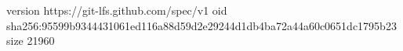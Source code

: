 version https://git-lfs.github.com/spec/v1
oid sha256:95599b9344431061ed116a88d59d2e29244d1db4ba72a44a60c0651dc1795b23
size 21960
